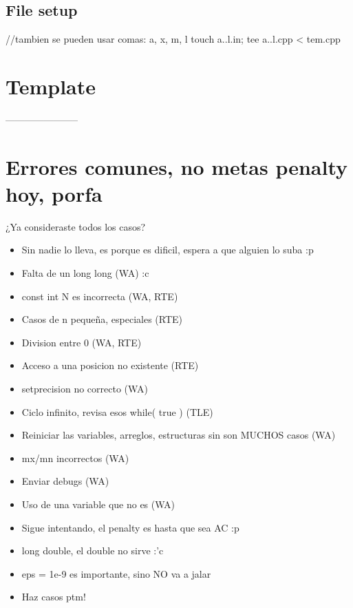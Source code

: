 \subsection*{File setup}
\begin{code}
//tambien se pueden usar comas: {a, x, m, l}
touch {a..l}.in; tee {a..l}.cpp < tem.cpp
\end{code}

\section{Template}
-----------------------

\section{Errores comunes, no metas penalty hoy, porfa}
¿Ya consideraste todos los casos?

\begin{itemize}
\item Sin nadie lo lleva, es porque es dificil, espera a que alguien lo suba :p
\item Falta de un long long (WA) :c
\item const int N es incorrecta (WA, RTE)
\item Casos de n pequeña, especiales (RTE)
\item Division entre 0 (WA, RTE)
\item Acceso a una posicion no existente (RTE)
\item setprecision no correcto (WA)
\item Ciclo infinito, revisa esos while( true ) (TLE)
\item Reiniciar las variables, arreglos, estructuras sin son MUCHOS casos (WA)
\item mx/mn incorrectos (WA)
\item Enviar debugs (WA)
\item Uso de una variable que no es (WA)
\item Sigue intentando, el penalty es hasta que sea AC :p
\item long double, el double no sirve :'c
\item eps = 1e-9 es importante, sino NO va a jalar
\item Haz casos ptm!
\end{itemize}


